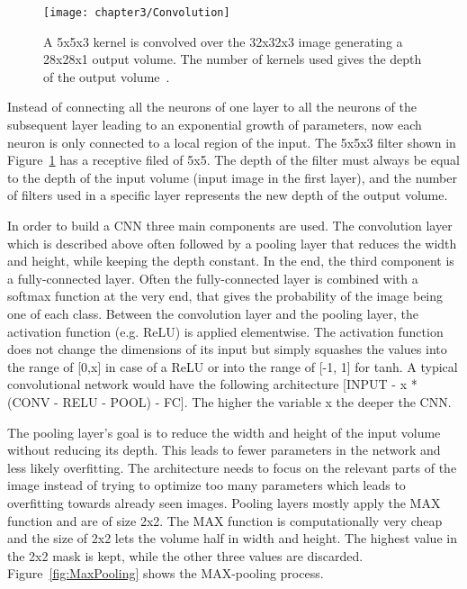 \begin{figure}[!h]
  \centering
  \caption{A 5x5x3 kernel is convolved over the 32x32x3 image generating a 28x28x1 output volume. The number of kernels used gives the depth of the output volume~\cite{cs231nconvolution}.}
  \texttt{[image: chapter3/Convolution]}
  \label{fig:Convolution}
\end{figure}

\quad

Instead of connecting all the neurons of one layer to all the neurons of the subsequent layer leading to an exponential growth of parameters, now each neuron is only connected to a local region of the input. The 5x5x3 filter shown in Figure~\ref{fig:Convolution} has a receptive filed of 5x5. The depth of the filter must always be equal to the depth of the input volume (input image in the first layer), and the number of filters used in a specific layer represents the new depth of the output volume.

In order to build a CNN three main components are used. The convolution layer which is described above often followed by a pooling layer that reduces the width and height, while keeping the depth constant. In the end, the third component is a fully-connected layer. Often the fully-connected layer is combined with a softmax function at the very end, that gives the probability of the image being one of each class. Between the convolution layer and the pooling layer, the activation function (e.g. ReLU) is applied elementwise. The activation function does not change the dimensions of its input but simply squashes the values into the range of [0,x] in case of a ReLU or into the range of [-1, 1] for tanh. A typical convolutional network would have the following architecture [INPUT - x * (CONV - RELU - POOL) - FC]. The higher the variable x the deeper the CNN.

The pooling layer's goal is to reduce the width and height of the input volume without reducing its depth. This leads to fewer parameters in the network and less likely overfitting. The architecture needs to focus on the relevant parts of the image instead of trying to optimize too many parameters which leads to overfitting towards already seen images. Pooling layers mostly apply the MAX function and are of size 2x2. The MAX function is computationally very cheap and the size of 2x2 lets the volume half in width and height. The highest value in the 2x2 mask is kept, while the other three values are discarded. Figure~\ref{fig:MaxPooling} shows the MAX-pooling process.\\


